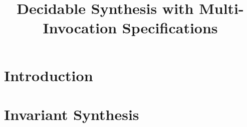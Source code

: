 \documentclass[runningheads]{llncs}
\begin{document}
\mainmatter  %

\title{Decidable Synthesis with Multi-Invocation Specifications}


%
%
%


%
%

\maketitle


\begin{abstract}

\end{abstract}



\section{Introduction}
\label{sec:intro}


\section{Invariant Synthesis}
\label{sec:invariant}







\appendix
%
\end{document}
